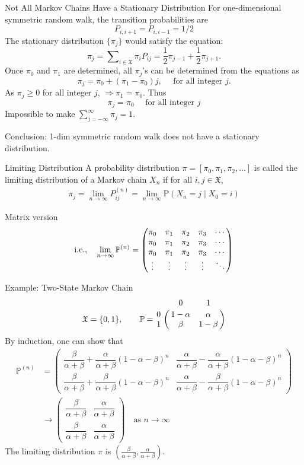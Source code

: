 \documentclass[letterpaper,handout]{beamer}
\def\P{\mathbb{P}}
\def\p{\mathrm P}
\def\Sum{\sum\nolimits}
\def\X{\mathfrak{X}}
\begin{document}
\begin{frame}{Not All Markov Chains Have a Stationary Distribution}
For one-dimensional symmetric random walk, the transition probabilities are
$$P_{i,i+1}=P_{i,i-1}=1/2$$
The stationary distribution $\{\pi_j\}$ would satisfy the equation:
$$\pi_j=\Sum_{i\in\X}\pi_iP_{ij}=\frac{1}{2}\pi_{j-1}+\frac{1}{2}\pi_{j+1}.$$
Once $\pi_0$ and $\pi_1$ are determined, all $\pi_j$'s can be determined from the equations as
$$\pi_j=\pi_0+(\pi_1-\pi_0)j,\quad\text{ for all integer }j.$$
As $\pi_j\ge 0$ for all integer $j$, $\Rightarrow \pi_1=\pi_0$. Thus
$$\pi_j=\pi_0 \quad\text{ for all integer }j$$
Impossible to make $\Sum_{j=-\infty}^{\infty}\pi_j=1.$\bigskip

Conclusion: 1-dim symmetric random walk does not have a stationary distribution.
\end{frame}
\begin{frame}{Limiting Distribution}
A probability distribution $\pi = [\pi_0, \pi_1, \pi_2, \ldots]$ is called the limiting distribution of a Markov chain $X_n$ if for all $i,j\in\X$,
\begin{align*}
\pi_j = \lim_{n\to\infty}P^{(n)}_{ij}
= \lim_{n \to \infty} \p (X_n = j \mid X_0 = i)
\end{align*}

Matrix version
$$\text{i.e.,}\quad\lim_{n\to\infty}\P^{(n)}=
\begin{pmatrix}
\pi_0 & \pi_1 & \pi_2 & \pi_3 &\cdots \cr
\pi_0 & \pi_1 & \pi_2 & \pi_3 &\cdots \cr
\pi_0 & \pi_1 & \pi_2 & \pi_3 &\cdots \cr
\vdots&\vdots&\vdots&\vdots&\ddots
\end{pmatrix}$$
\end{frame}


\begin{frame}{Example: Two-State Markov Chain}
$$
\X = \{0, 1\},\qquad
\P=\bordermatrix{%
 & 0  & 1\cr
0& 1-\alpha  & \alpha\cr
1& \beta & 1-\beta\cr
}$$
By induction, one can show that
\begin{align*}
\P^{(n)}&=
\begin{pmatrix}
\dfrac{\beta }{\alpha+\beta}+\dfrac{\alpha}{\alpha+\beta}(1\!-\!\alpha\!-\!\beta)^n &
\dfrac{\alpha}{\alpha+\beta}-\dfrac{\alpha}{\alpha+\beta}(1\!-\!\alpha\!-\!\beta)^n\\[8pt]
\dfrac{\beta }{\alpha+\beta}+\dfrac{\beta }{\alpha+\beta}(1\!-\!\alpha\!-\!\beta)^n &
\dfrac{\alpha}{\alpha+\beta}-\dfrac{\beta }{\alpha+\beta}(1\!-\!\alpha\!-\!\beta)^n
\end{pmatrix}\\
&\to
\begin{pmatrix}
\dfrac{\beta }{\alpha+\beta} &
\dfrac{\alpha}{\alpha+\beta}\\[8pt]
\dfrac{\beta }{\alpha+\beta} &
\dfrac{\alpha}{\alpha+\beta}
\end{pmatrix}\quad\text{as }n\to\infty
\end{align*}
The limiting distribution $\pi$ is $(\frac{\beta }{\alpha+\beta},\frac{\alpha}{\alpha+\beta}).$
\end{frame}
\end{document}
